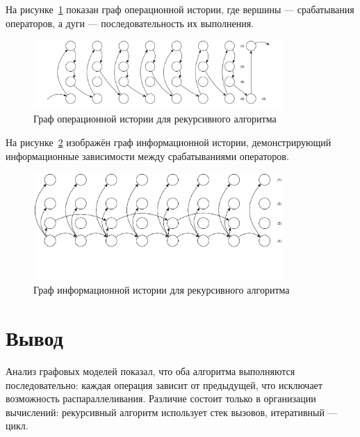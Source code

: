 На рисунке~\ref{recursive_oper_history} показан граф операционной истории, где вершины --- срабатывания операторов, а дуги --- последовательность их выполнения.

\begin{figure}[H]
	\centering
	\includegraphics[width=0.85\textwidth,keepaspectratio]{images/recursive_oper_history}
	\caption{Граф операционной истории для рекурсивного алгоритма}
	\label{recursive_oper_history}
\end{figure}

На рисунке~\ref{recursive_info_history} изображён граф информационной истории, демонстрирующий информационные зависимости между срабатываниями операторов.

\begin{figure}[H]
	\centering
	\includegraphics[width=0.85\textwidth,keepaspectratio]{images/recursive_info_history}
	\caption{Граф информационной истории для рекурсивного алгоритма}
	\label{recursive_info_history}
\end{figure}

\section*{Вывод}

Анализ графовых моделей показал, что оба алгоритма выполняются последовательно: каждая операция зависит от предыдущей, что исключает возможность распараллеливания.  
Различие состоит только в организации вычислений: рекурсивный алгоритм использует стек вызовов, итеративный --- цикл.
